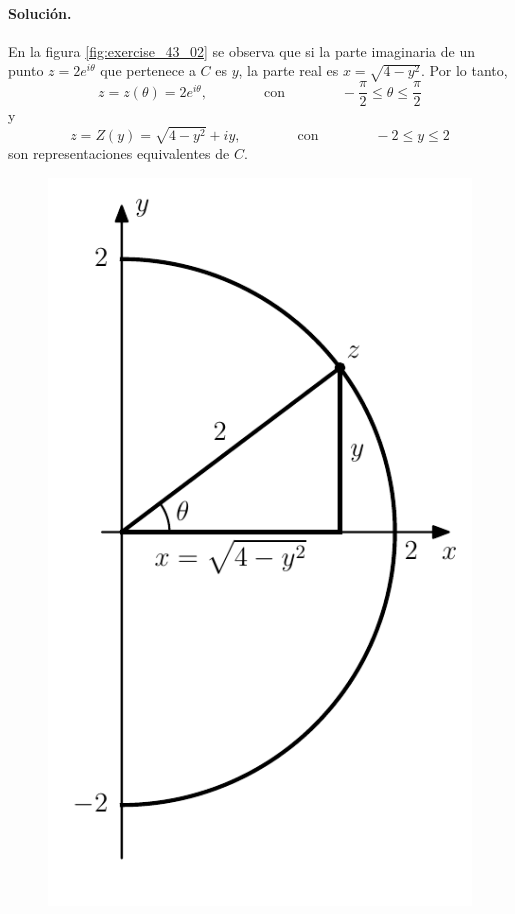 \documentclass[a4paper]{report}
\begin{document}
\paragraph{Solución.} En la figura \ref{fig:exercise_43_02} se observa que si la parte imaginaria de un punto \(z=2e^{i\theta}\) que pertenece a \(C\) es \(y\), la parte real es \(x=\sqrt{4-y^2}\). Por lo tanto,
\[
 z=z(\theta)=2e^{i\theta},
 \qquad\qquad\textrm{con}\qquad\qquad
 -\frac{\pi}{2}\leq\theta\leq\frac{\pi}{2} 
\]
y
\[
 z=Z(y)=\sqrt{4-y^2}+iy,
 \qquad\qquad\textrm{con}\qquad\qquad
 -2\leq y\leq2
\]
son representaciones equivalentes de \(C\). 
\begin{figure}[!htb]
  \begin{minipage}[c]{0.35\textwidth}
    \includegraphics[width=\textwidth]{figuras/exercise_43_02.pdf}

\end{minipage}
\end{figure}
\end{document}
